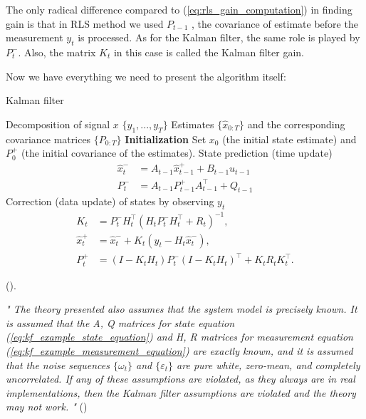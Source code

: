 The only radical difference compared to (\ref{eq:rls_gain_computation}) in finding gain is that in RLS method we used \(P_{t-1}\) , the covariance of estimate before the measurement \(y_t\) is processed. As for the Kalman filter, the same role is played by \(P_{t}^-\). Also, the matrix \(K_t\) in this case is called the Kalman filter gain.

Now we have everything we need to present the algorithm itself:

\begin{algorithm}
    \caption{Kalman filter}
  \begin{algorithmic}[1]
    \REQUIRE Decomposition of signal $x$
    \INPUT \(\{y_1, . . . , y_T\}\)
    \OUTPUT Estimates \(\{\hat{x}_{0:T}\}\) and the corresponding covariance matrices \(\{P_{0:T}\}\)
    \STATE \textbf{Initialization} Set $x_0$ (the initial state estimate) and $P_0^+$ (the initial covariance of the estimates).
      \STATE State prediction (time update)
        \begin{align*}
            \hat{x}_t^{-}&= A_{t-1} \hat{x}_{t-1}^{+} + B_{t-1} u_{t-1}  \\
            P_t^{-}&=A_{t-1} P_{t-1}^{+} A_{t-1}^\intercal + Q_{t-1}
        \end{align*}
      \STATE Correction (data update) of states by observing $y_t$
        \begin{align*}
            K_t &= P_{t}^- H_t^\intercal (H_t P_{t}^{-} H_t^\intercal + R_t)^{-1},\\
            \hat{x}_t^+ &= \hat{x}_{t}^{-} + K_t(y_t - H_t \hat{x}_{t}^{-}), \\
            P_t^{+} &= (I - K_t H_t) P_{t}^{-} (I - K_t H_t)^\intercal + K_t R_t K_t^\intercal.
        \end{align*}
    \ENDFOR
  \end{algorithmic}
\end{algorithm}

(\cite[Chapter~5]{simon_optimal_2006}).

{\em
"
The theory presented also assumes that the system model is precisely known. It
is assumed that the A, Q matrices for state equation ({\ref{eq:kf_example_state_equation}}) and H, R matrices for measurement equation ({\ref{eq:kf_example_measurement_equation}}) are exactly known, and it is assumed that the noise sequences \(\{\omega_t\}\) and \(\{\varepsilon_t\}\) are pure white, zero-mean, and completely uncorrelated. If any of these assumptions are violated, as they always are in real implementations, then the Kalman filter assumptions are violated and the theory may not work.
"
}(\cite[page~140]{simon_optimal_2006})

